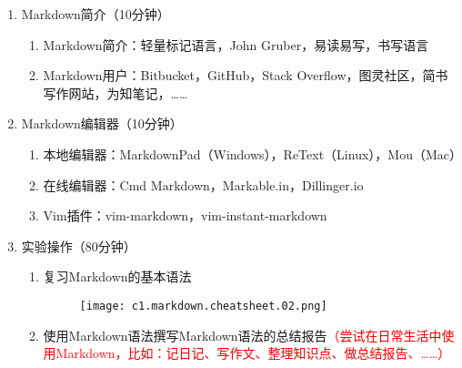 \documentclass{TIJMUjiaoanSY}
\begin{document}
\firstTail

\newpage
\otherHeader

\begin{enumerate}
  \item Markdown简介（10分钟）
    \begin{enumerate}
      \item Markdown简介：轻量标记语言，John Gruber，易读易写，书写语言
      \item Markdown用户：Bitbucket，GitHub，Stack Overflow，图灵社区，简书写作网站，为知笔记，……
    \end{enumerate}
  \item Markdown编辑器（10分钟）
    \begin{enumerate}
      \item 本地编辑器：MarkdownPad（Windows），ReText（Linux），Mou（Mac）
      \item 在线编辑器：Cmd Markdown，Markable.in，Dillinger.io
      \item Vim插件：vim-markdown，vim-instant-markdown
    \end{enumerate}
  \item 实验操作（80分钟）
    \begin{enumerate}
      \item 复习Markdown的基本语法
    \begin{figure}[h]
      \centering
      \texttt{[image: c1.markdown.cheatsheet.02.png]}
    \end{figure}
  \item
    使用Markdown语法撰写Markdown语法的总结报告\textcolor{red}{（尝试在日常生活中使用Markdown，比如：记日记、写作文、整理知识点、做总结报告、……）}
    \end{enumerate}
\end{enumerate}

\otherTail
\end{document}
